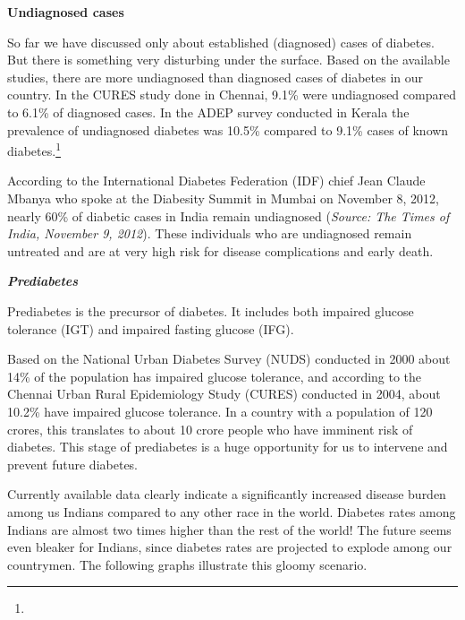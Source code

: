
\textbf{Undiagnosed cases}

So far we have discussed only about established (diagnosed) cases of diabetes. But there is something very disturbing under the surface. Based on the available studies, there are more undiagnosed than diagnosed cases of diabetes in our country. In the CURES study done in Chennai, 9.1\% were undiagnosed compared to 6.1\% of diagnosed cases. In the ADEP survey conducted in Kerala the prevalence of undiagnosed diabetes was 10.5\% compared to 9.1\% cases of known diabetes.\footnote{}

According to the International Diabetes Federation (IDF) chief Jean Claude Mbanya who spoke at the Diabesity Summit in Mumbai on November 8, 2012, nearly 60\% of diabetic cases in India remain undiagnosed (\textit{Source: The Times of India, November 9, 2012}). These individuals who are undiagnosed remain untreated and are at very high risk for disease complications and early death.

\textbf{\textit{Prediabetes}}

Prediabetes is the precursor of diabetes. It includes both impaired glucose tolerance (IGT) and impaired fasting glucose (IFG).

Based on the National Urban Diabetes Survey (NUDS) conducted in 2000 about 14\% of the population has impaired glucose tolerance, and according to the Chennai Urban Rural Epidemiology Study (CURES) conducted in 2004, about 10.2\% have impaired glucose tolerance. In a country with a population of 120 crores, this translates to about 10 crore people who have imminent risk of diabetes. This stage of prediabetes is a huge opportunity for us to intervene and prevent future diabetes.


Currently available data clearly indicate a significantly increased disease burden among us Indians compared to any other race in the world. Diabetes rates among Indians are almost two times higher than the rest of the world! The future seems even bleaker for Indians, since diabetes rates are projected to explode among our countrymen. The following graphs illustrate this gloomy scenario.


